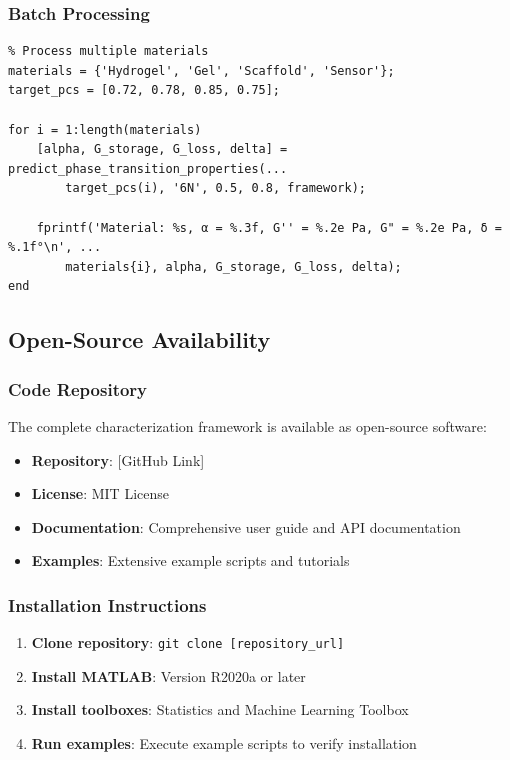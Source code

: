 \subsubsection{Batch Processing}
\begin{verbatim}
% Process multiple materials
materials = {'Hydrogel', 'Gel', 'Scaffold', 'Sensor'};
target_pcs = [0.72, 0.78, 0.85, 0.75];

for i = 1:length(materials)
    [alpha, G_storage, G_loss, delta] = predict_phase_transition_properties(...
        target_pcs(i), '6N', 0.5, 0.8, framework);
    
    fprintf('Material: %s, α = %.3f, G'' = %.2e Pa, G" = %.2e Pa, δ = %.1f°\n', ...
        materials{i}, alpha, G_storage, G_loss, delta);
end
\end{verbatim}

\subsection{Open-Source Availability}

\subsubsection{Code Repository}
The complete characterization framework is available as open-source software:

\begin{itemize}
    \item \textbf{Repository}: [GitHub Link]
    \item \textbf{License}: MIT License
    \item \textbf{Documentation}: Comprehensive user guide and API documentation
    \item \textbf{Examples}: Extensive example scripts and tutorials
\end{itemize}

\subsubsection{Installation Instructions}
\begin{enumerate}
    \item \textbf{Clone repository}: \texttt{git clone [repository\_url]}
    \item \textbf{Install MATLAB}: Version R2020a or later
    \item \textbf{Install toolboxes}: Statistics and Machine Learning Toolbox
    \item \textbf{Run examples}: Execute example scripts to verify installation
\end{enumerate}

